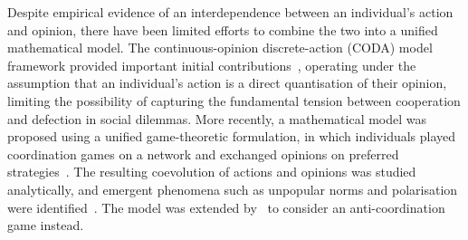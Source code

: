 \documentclass[letterpaper, 10 pt, conference]{ieeeconf}  %
\begin{document}
 

Despite empirical evidence of an interdependence between an individual's action and opinion, there have been limited efforts to combine the two into a unified mathematical model. The continuous-opinion discrete-action (CODA) model framework provided important initial contributions~\cite{martins_coda_2008,ceragioli_coda_2018}, operating under the assumption that an individual's action is a direct quantisation of their opinion, limiting the possibility of capturing the fundamental tension between cooperation and defection in social dilemmas. More recently, a mathematical model was proposed using a unified game-theoretic formulation, in which individuals played coordination games on a network and exchanged opinions on preferred strategies~\cite{aghbolagh_coevolutionary_2023}. The resulting coevolution of actions and opinions was studied analytically, and emergent phenomena such as unpopular norms and polarisation were identified~\cite{aghbolagh_coevolutionary_2023}. 
The model was extended by~\cite{liang_coevolution_2025} to consider an anti-coordination game instead. 

\end{document}
